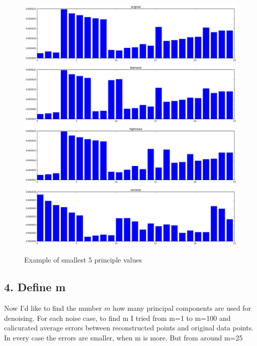 \documentclass[a4paper,11pt]{article}
\begin{document}
\begin{figure}[htbp]
  \includegraphics[scale=0.4]{orgev2.png}
  \includegraphics[scale=0.4]{lowev2.png}
  \includegraphics[scale=0.4]{stev2.png}
  \includegraphics[scale=0.4]{exev2.png}
   \caption{Example of smallest 5 principle values}
\end{figure}
\subsection*{4. Define m}
Now I'd like to find the number $m$ how many principal components are used for denoising. For each noise case, to find m I tried from m=1 to m=100 and calicurated average errors between reconstructed points and original data points. \\
In every case the errors are smaller, when m is more. But from around m=25 
\end{document}

